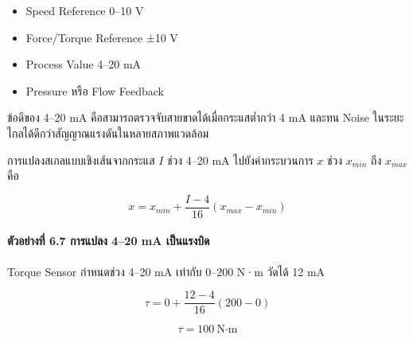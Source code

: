 \begin{itemize}
    \item Speed Reference 0–10 V
    \item Force/Torque Reference ±10 V
    \item Process Value 4–20 mA
    \item Pressure หรือ Flow Feedback
\end{itemize}

ข้อดีของ 4–20 mA คือสามารถตรวจจับสายขาดได้เมื่อกระแสต่ำกว่า 4 mA และทน Noise ในระยะไกลได้ดีกว่าสัญญาณแรงดันในหลายสภาพแวดล้อม

การแปลงสเกลแบบเชิงเส้นจากกระแส $I$ ช่วง 4–20 mA ไปยังค่ากระบวนการ $x$ ช่วง $x_{min}$ ถึง $x_{max}$ คือ

\[
x=x_{min}+\frac{I-4}{16}(x_{max}-x_{min})
\]

\paragraph{ตัวอย่างที่ 6.7 การแปลง 4–20 mA เป็นแรงบิด}

Torque Sensor กำหนดช่วง 4–20 mA เท่ากับ 0–200 N·m วัดได้ 12 mA

\[
\tau=0+\frac{12-4}{16}(200-0)
\]

\[
\tau=100\ \text{N·m}
\]



